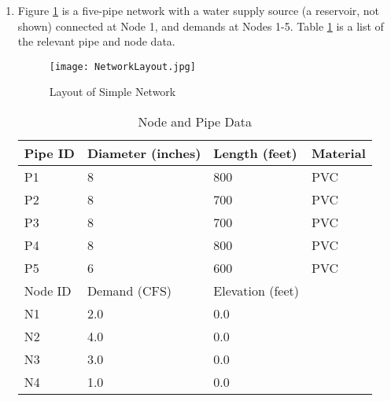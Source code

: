 \documentclass[12pt]{article}
\begin{document}
\begin{enumerate}

\item Figure \ref{fig:NetworkLayout} is a five-pipe network with a water supply source (a reservoir, not shown) connected at Node 1, and demands at Nodes 1-5.
Table \ref{tab:PipeData} is a list of the relevant pipe and node data.

\begin{figure}[h!] %
\centering
   \texttt{[image: NetworkLayout.jpg]}
   \caption{Layout of Simple Network}
   \label{fig:NetworkLayout} 
\end{figure}

\begin{table}[htbp]
   \centering
   \caption{Node and Pipe Data}
    \begin{tabular}{p{1in} p{1in} p{1in} p{1in} } %
    \hline
    \hline
Pipe ID & Diameter (inches) & Length (feet) & Material \\
\hline
P1 & 8 & 800 & PVC  \\
P2 & 8 & 700 & PVC  \\
P3 & 8 & 700 & PVC  \\
P4 & 8 & 800 & PVC  \\
P5 & 6 & 600 & PVC  \\
\hline
\hline
Node ID & Demand (CFS) & Elevation (feet) & ~~ \\
\hline
N1 & 2.0 & 0.0 & ~~ \\
N2 & 4.0 & 0.0 & ~~ \\
N3 & 3.0 & 0.0 & ~~ \\
N4 & 1.0 & 0.0 & ~~ \\
   \end{tabular}
   \label{tab:PipeData}
\end{table}


\end{enumerate}
\end{document}
